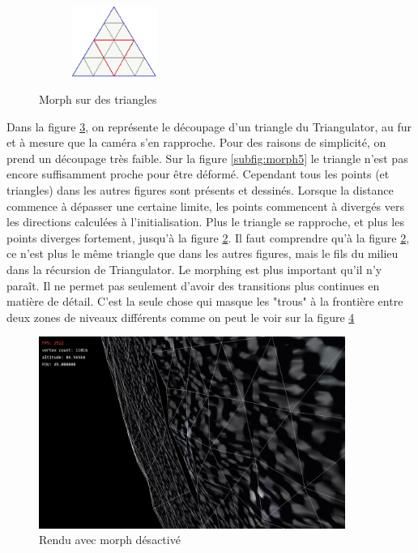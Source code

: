 \begin{figure}[H]
\begin{subfigure}[b]{0.16\textwidth}
       \caption{}\label{subfig:morph2}
    \end{subfigure}
     ~
    \begin{subfigure}[b]{0.16\textwidth}
       \centering \includegraphics[width=\textwidth,height=2.3cm]{img/morph1.png}
       \caption{}\label{subfig:morph1}
    \end{subfigure}
    \caption{Morph sur des triangles}\label{fig:morphTri}
\end{figure}

    Dans la figure \ref{fig:morphTri}, on représente le découpage d'un triangle du Triangulator, au fur et à mesure que la caméra s'en rapproche. Pour des raisons de simplicité, on prend un découpage très faible.
    Sur la figure \ref{subfig:morph5} le triangle n'est pas encore suffisamment proche pour être déformé. Cependant tous les points (et triangles) dans les autres figures sont présents et dessinés. 
    Lorsque la distance commence à dépasser une certaine limite, les points commencent à divergés vers les directions calculées à l'initialisation. Plus le triangle se rapproche, et plus les points diverges fortement, jusqu'à la figure \ref{subfig:morph1}. Il faut comprendre qu'à la figure \ref{subfig:morph1}, ce n'est plus le même triangle que dans les autres figures, mais le fils du milieu dans la récursion de Triangulator.
    Le morphing est plus important qu'il n'y paraît. Il ne permet pas seulement d'avoir des transitions plus continues en matière de détail. C'est la seule chose qui masque les "trous" à la frontière entre deux zones de niveaux différents comme on peut le voir sur la figure \ref{fig:noMorphingHole}
 \begin{figure}[H]
  \centerline{
  \includegraphics[width=10cm]{img/noMorphingHole.png}}
  \caption{Rendu avec morph désactivé}
  \label{fig:noMorphingHole}
  \end{figure}

